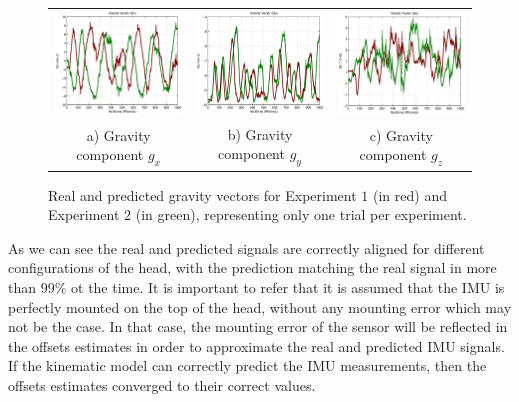 \begin{figure}
\centering
\begin{tabular}{ccc}
 \includegraphics[width=0.32\linewidth]{images/results/gravity_vector_x} &
 \includegraphics[width=0.32\linewidth]{images/results/gravity_vector_y} &
 \includegraphics[width=0.32\linewidth]{images/results/gravity_vector_z} \\
 a) Gravity component $g_x$ &
 b) Gravity component $g_y$ &
 c) Gravity component $g_z$ \\
\end{tabular}
\caption{Real and predicted gravity vectors for Experiment $1$ (in red) and Experiment $2$ (in green), representing only one trial per experiment.}
\label{fig:real_head_imu}
\end{figure}

As we can see the real and predicted signals are correctly aligned for different configurations of the head, with the prediction matching the real signal in more than $99\%$ ot the time. It is important to refer that it is assumed that the IMU is perfectly mounted on the top of the head, without any mounting error which may not be the case. In that case, the mounting error of the sensor will be reflected in the offsets estimates in order to approximate the real and predicted IMU signals. If the kinematic model can correctly predict the IMU measurements, then the offsets estimates converged to their correct values. 
